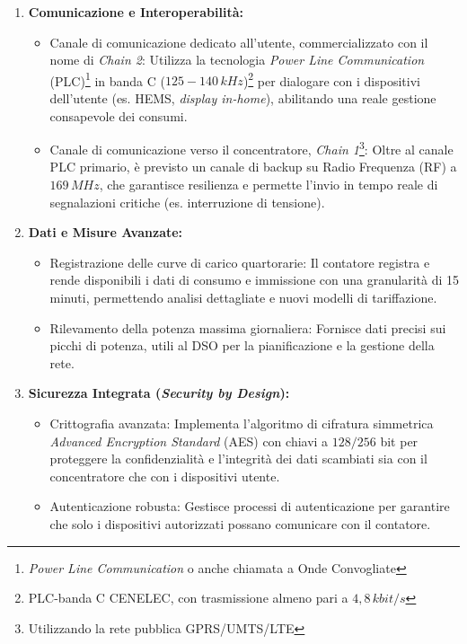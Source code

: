 \begin{enumerate}
    \item \textbf{Comunicazione e Interoperabilità:}
    
    \begin{itemize}
        \item Canale di comunicazione dedicato all'utente, commercializzato con il nome di \textit{Chain 2}: Utilizza la tecnologia \textit{Power Line Communication} (PLC)\footnote{\textit{Power Line Communication} o anche chiamata a Onde Convogliate} in banda C ($125-140\,kHz$)\footnote{PLC-banda C CENELEC, con trasmissione almeno pari a $4,8\, kbit/s$} per dialogare con i dispositivi dell'utente (es. HEMS, \textit{display in-home}), abilitando una reale gestione consapevole dei consumi.
        \item Canale di comunicazione verso il concentratore, \textit{Chain 1}\footnote{Utilizzando la rete pubblica GPRS/UMTS/LTE}: Oltre al canale PLC primario, è previsto un canale di backup su Radio Frequenza (RF) a $169\,MHz$, che garantisce resilienza e permette l'invio in tempo reale di segnalazioni critiche (es. interruzione di tensione).
    \end{itemize}
    
    \item \textbf{Dati e Misure Avanzate:}
    \begin{itemize}
        \item Registrazione delle curve di carico quartorarie: Il contatore registra e rende disponibili i dati di consumo e immissione con una granularità di 15 minuti, permettendo analisi dettagliate e nuovi modelli di tariffazione.
        \item Rilevamento della potenza massima giornaliera: Fornisce dati precisi sui picchi di potenza, utili al DSO per la pianificazione e la gestione della rete.
    \end{itemize}
        \newpage
    \item \textbf{Sicurezza Integrata (\textit{Security by Design}):}
    \begin{itemize}
        \item Crittografia avanzata: Implementa l'algoritmo di cifratura simmetrica \textit{Advanced Encryption Standard} (AES) con chiavi a $128/256$ bit per proteggere la confidenzialità e l'integrità dei dati scambiati sia con il concentratore che con i dispositivi utente.
        \item Autenticazione robusta: Gestisce processi di autenticazione per garantire che solo i dispositivi autorizzati possano comunicare con il contatore.
    \end{itemize}
        

\end{enumerate}
